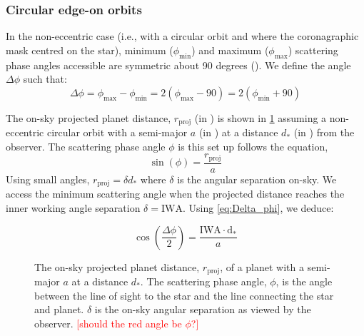 \documentclass[
    usenatbib,
]{mnras}
\newcommand{\todo}[1]{\textcolor{red}{[#1]}}
\begin{document}

\subsubsection{Circular edge-on orbits}

In the non-eccentric case (i.e., with a circular orbit and where the coronagraphic mask centred on the star), minimum ($\phi_\mathrm{min}$) and maximum ($\phi_\mathrm{max}$) scattering phase angles accessible are symmetric about 90 degrees (). 
%
We define the angle $\Delta \phi$ such that: 
\begin{equation}
    \label{eq:Delta_phi}
    \Delta \phi 
    = \phi_\mathrm{max} - \phi_\mathrm{min}
    =  2(\phi_\mathrm{max} - 90) 
    =  2(\phi_\mathrm{min} + 90)
\end{equation}

The on-sky projected planet distance, $r_\mathrm{proj}$ (in \si{\au}) is shown in \cref{fig:scattering-angle} assuming a non-eccentric circular orbit with a semi-major $a$ (in \si{\au}) at a distance $d_*$ (in \si{\parsec}) from the observer. 
%
The scattering phase angle $\phi$ is this set up follows the equation,
\begin{equation}
    \sin(\phi) = \frac{r_\mathrm{proj}}{a}
\end{equation}
%
Using small angles, $r_\mathrm{proj} = \delta d_*$ where $\delta$ is the angular separation on-sky.
%
We access the minimum scattering angle when the projected distance reaches the inner working angle separation $\delta = \mathrm{IWA}$. 
%
Using \cref{eq:Delta_phi}, we deduce:

\begin{equation}
    \label{eq:scattering_angle}
    \cos\left(\dfrac{\Delta \phi}{2}\right) = \frac{\mathrm{IWA \cdot d_*}}{a}
\end{equation}
 
\begin{figure}
    \centering
    
    \caption{
        The on-sky projected planet distance, $r_\mathrm{proj}$, of a planet with a semi-major $a$ at a distance $d_*$. The scattering phase angle, $\phi$, is the angle between the line of sight to the star and the line connecting the star and planet. $\delta$ is the on-sky angular separation as viewed by the observer. \todo{should the red angle be $\phi$?}
    }
    \label{fig:scattering-angle}
\end{figure}
\end{document}
